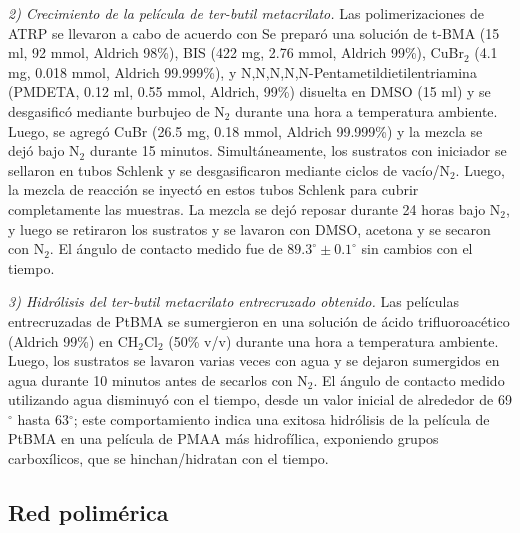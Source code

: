 \emph{2) Crecimiento de la película de ter-butil metacrilato.}
 Las polimerizaciones de ATRP se llevaron a cabo de acuerdo con \addcite[Brown2009] Se prepar\'o una soluci\'on de t-BMA (15 ml, 92 mmol, Aldrich 98\%), BIS (422 mg, 2.76 mmol, Aldrich 99\%), CuBr$_2$ (4.1 mg, 0.018 mmol, Aldrich 99.999\%), y N,N,N,N,N-Pentametildietilentriamina (PMDETA, 0.12 ml, 0.55 mmol, Aldrich, 99\%) disuelta en DMSO (15 ml) y se desgasific\'o mediante burbujeo de N$_2$ durante una hora a temperatura ambiente. Luego, se agregó CuBr (26.5 mg, 0.18 mmol, Aldrich 99.999\%) y la mezcla se dej\'o bajo N$_2$ durante 15 minutos. Simult\'aneamente, los sustratos con iniciador se sellaron en tubos Schlenk y se desgasificaron mediante ciclos de vac\'io/N$_2$. Luego, la mezcla de reacci\'on se inyect\'o en estos tubos Schlenk para cubrir completamente las muestras. La mezcla se dej\'o reposar durante 24 horas bajo N$_2$, y luego se retiraron los sustratos y se lavaron con DMSO, acetona y se secaron con N$_2$. El \'angulo de contacto medido fue de $89.3^\circ \pm 0.1^\circ$ sin cambios con el tiempo.

\emph{3) Hidrólisis del ter-butil metacrilato entrecruzado obtenido.}
 Las pel\'iculas entrecruzadas de PtBMA se sumergieron en una soluci\'on de \'acido trifluoroac\'etico (Aldrich 99\%) en CH$_2$Cl$_2$ (50\% v/v) durante una hora a temperatura ambiente. Luego, los sustratos se lavaron varias veces con agua y se dejaron sumergidos en agua durante 10 minutos antes de secarlos con N$_2$. El \'angulo de contacto medido utilizando agua disminuy\'o con el tiempo, desde un valor inicial de alrededor de 69$^\circ$ hasta 63$^\circ$; este comportamiento indica una exitosa hidr\'olisis de la película de PtBMA en una pel\'icula de PMAA m\'as hidrofílica, exponiendo grupos carbox\'ilicos, que se hinchan/hidratan con el tiempo.





\subsection{Red polim\'erica}

